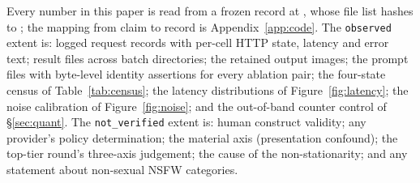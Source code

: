 \documentclass[11pt]{article}
\begin{document}
Every number in this paper is read from a frozen record at \fFrozenAt, whose file
list hashes to \fFileHash; the mapping from claim to record is
Appendix~\ref{app:code}. The \texttt{observed} extent is: \fTotal{} logged request
records with per-cell HTTP state, latency and error text; \fFiles{} result files
across \fBatches{} batch directories; the retained output images; the prompt files
with byte-level identity assertions for every ablation pair; the four-state census
of Table~\ref{tab:census}; the latency distributions of Figure~\ref{fig:latency};
the noise calibration of Figure~\ref{fig:noise}; and the out-of-band counter control
of \S\ref{sec:quant}. The \texttt{not\_verified} extent is: human construct
validity; any provider's policy determination; the material axis (presentation
confound); the top-tier round's three-axis judgement; the cause of the
non-stationarity; and any statement about non-sexual NSFW categories.

\clearpage


\clearpage
\appendix
\renewcommand{\thesection}{\arabic{section}}

\end{document}
